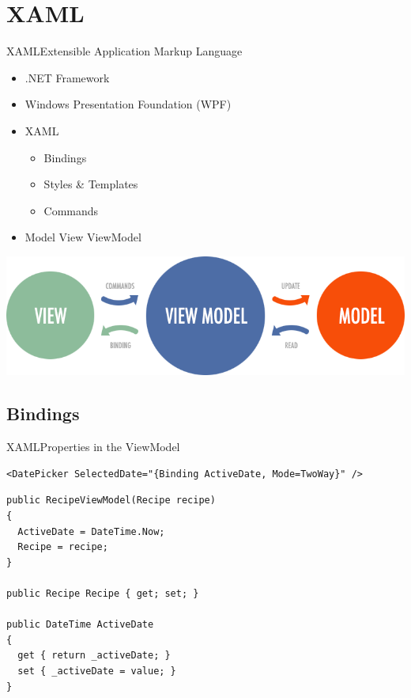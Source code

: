 \section{XAML} 
\begin{frame}[fragile]{XAML}{Extensible Application Markup Language}
  \begin{itemize}
    \item .NET Framework
    \item Windows Presentation Foundation (WPF)
    \item XAML
    \begin{itemize}
      \item Bindings
      \item Styles \& Templates
      \item Commands
    \end{itemize}
    \item Model View ViewModel
  \end{itemize}


  \includegraphics[width=\textwidth]{graphics/mvvm.png}

\end{frame}

\subsection{Bindings} 
\begin{frame}[fragile]{XAML}{Properties in the ViewModel}

\begin{lstlisting}
<DatePicker SelectedDate="{Binding ActiveDate, Mode=TwoWay}" />
\end{lstlisting}

\begin{lstlisting}
public RecipeViewModel(Recipe recipe)
{
  ActiveDate = DateTime.Now;
  Recipe = recipe;
}

public Recipe Recipe { get; set; }

public DateTime ActiveDate
{
  get { return _activeDate; }
  set { _activeDate = value; }
}
\end{lstlisting}

\end{frame}

